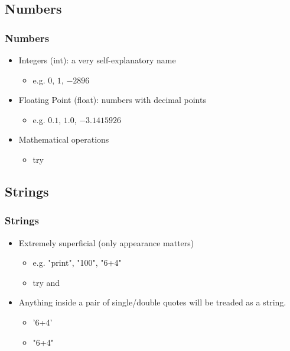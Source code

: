 \documentclass[xcolor={usenames, dvipsnames}, hyperref={colorlinks,linkcolor=black, urlcolor=blue}]{beamer}
\begin{document}
\subsection{Numbers} 
\begin{frame}
\frametitle{Numbers}

\begin{itemize}
\item Integers (int): a very self-explanatory name
	\begin{itemize}
	\item e.g. $0$, $1$, $-2896$
	\end{itemize}
\end{itemize}

\begin{itemize}
\item Floating Point (float): numbers with decimal points
	\begin{itemize}
	\item e.g. $0.1$, $1.0$, $-3.1415926$
	\end{itemize}
\end{itemize}

\begin{itemize}
\item Mathematical operations
	\begin{itemize}
	\item try 
	\end{itemize}
\end{itemize}
\end{frame}

\subsection{Strings} 
\begin{frame}
\frametitle{Strings}

\begin{itemize}
\item Extremely superficial (only appearance matters)
	\begin{itemize}
	\item e.g. "print", "100", "6+4"
	\item try  and 
	\end{itemize}
\end{itemize}

\begin{itemize}
\item Anything inside a pair of single/double quotes will be treaded as a string.
	\begin{itemize}
	\item '6+4'
	\item "6+4"
	\end{itemize}
\end{itemize}

\end{frame}
\end{document}
